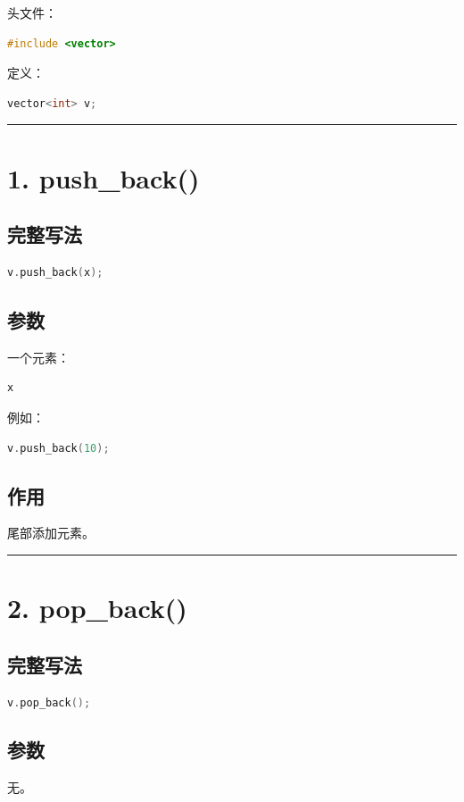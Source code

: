 \documentclass[9pt,twocolumn]{extarticle}
\begin{document}
头文件：
\begin{lstlisting}[language=C++]
#include <vector>
\end{lstlisting}
定义：
\begin{lstlisting}[language=C++]
vector<int> v;
\end{lstlisting}

\noindent\rule{\linewidth}{0.4pt}

\section{1. push\_back()}

\subsection{完整写法}
\begin{lstlisting}[language=C++]
v.push_back(x);
\end{lstlisting}

\subsection{参数}
一个元素：
\begin{lstlisting}[language=C++]
x
\end{lstlisting}
例如：
\begin{lstlisting}[language=C++]
v.push_back(10);
\end{lstlisting}

\subsection{作用}
尾部添加元素。

\noindent\rule{\linewidth}{0.4pt}

\section{2. pop\_back()}

\subsection{完整写法}
\begin{lstlisting}[language=C++]
v.pop_back();
\end{lstlisting}

\subsection{参数}
无。
\end{document}

